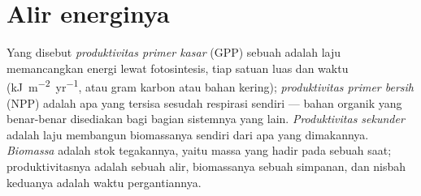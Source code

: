 \section{Alir energinya}

\begin{definition}[Produktivitas]\label{def:b1:ecosystem-organization:productivity}
Yang disebut \emph{produktivitas primer kasar} (GPP) sebuah 
adalah laju  memancangkan energi lewat fotosintesis, tiap
satuan luas dan waktu (\unit{kJ.m^{-2}.yr^{-1}}, atau gram karbon atau
bahan kering); \emph{produktivitas primer bersih} (NPP) adalah apa
yang tersisa sesudah respirasi  sendiri --- bahan organik
yang benar-benar disediakan bagi bagian sistemnya yang lain.
\emph{Produktivitas sekunder} adalah laju  membangun
biomassanya sendiri dari apa yang dimakannya. \emph{Biomassa} adalah
stok tegakannya, yaitu massa yang hadir pada sebuah saat;
produktivitasnya adalah sebuah alir, biomassanya sebuah simpanan, dan
nisbah keduanya adalah waktu pergantiannya.
\end{definition}

